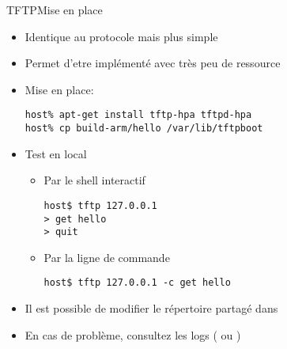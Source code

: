\begin{frame}[fragile=singleslide]{TFTP}{Mise en place}
  \begin{itemize}
  \item Identique au protocole  mais plus simple
  \item Permet d'etre implémenté avec très peu de ressource
  \item Mise en place:
    \begin{lstlisting}
host% apt-get install tftp-hpa tftpd-hpa
host% cp build-arm/hello /var/lib/tftpboot
    \end{lstlisting}
  \item Test en local
    \begin{itemize}
    \item Par le shell interactif
      \begin{lstlisting}
host$ tftp 127.0.0.1
> get hello
> quit
      \end{lstlisting}
    \item Par la ligne de commande
      \begin{lstlisting}
host$ tftp 127.0.0.1 -c get hello
      \end{lstlisting} %
    \end{itemize}
  \item  Il  est  possible  de  modifier le  répertoire  partagé  dans
  \item En cas de  problème, consultez les logs (
    ou )
  \end{itemize}
\end{frame}

